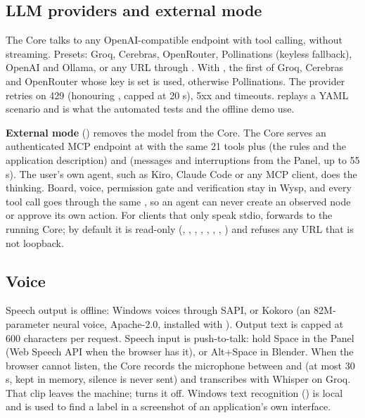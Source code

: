 \subsection{LLM providers and external mode}\label{sec:core-llm}

The Core talks to any OpenAI-compatible endpoint with tool calling, without streaming. Presets: Groq, Cerebras, OpenRouter, Pollinations (keyless fallback), OpenAI and Ollama, or any URL through . With , the first of Groq, Cerebras and OpenRouter whose key is set is used, otherwise Pollinations. The provider retries on 429 (honouring , capped at 20 s), 5xx and timeouts.  replays a YAML scenario and is what the automated tests and the offline demo use.

\textbf{External mode} () removes the model from the Core. The Core serves an authenticated MCP endpoint at  with the same 21 tools plus  (the rules and the application description) and  (messages and interruptions from the Panel, up to 55 s). The user's own agent, such as Kiro, Claude Code or any MCP client, does the thinking. Board, voice, permission gate and verification stay in Wysp, and every tool call goes through the same , so an agent can never create an observed node or approve its own action. For clients that only speak stdio,  forwards to the running Core; by default it is read-only (, , , , , , , ) and refuses any URL that is not loopback.

\subsection{Voice}

Speech output is offline: Windows voices through SAPI, or Kokoro (an 82M-parameter neural voice, Apache-2.0, installed with ). Output text is capped at 600 characters per request. Speech input is push-to-talk: hold Space in the Panel (Web Speech API when the browser has it), or Alt+Space in Blender. When the browser cannot listen, the Core records the microphone between  and  (at most 30 s, kept in memory, silence is never sent) and transcribes with Whisper on Groq. That clip leaves the machine;  turns it off. Windows text recognition () is local and is used to find a label in a screenshot of an application's own interface.

